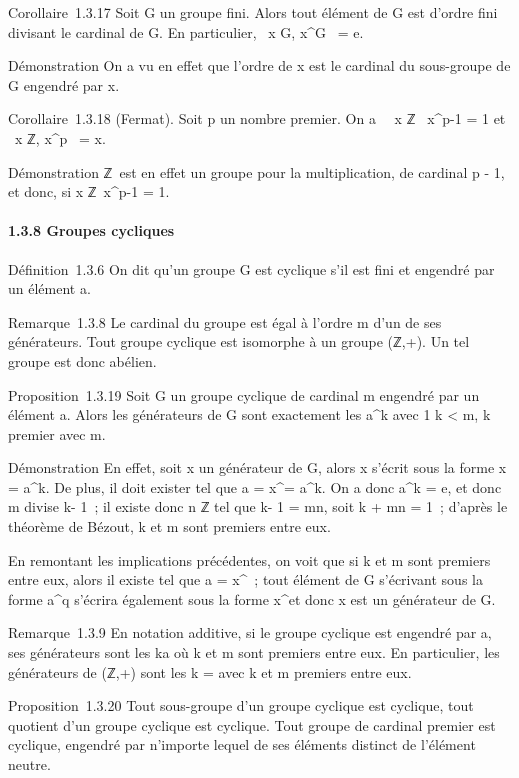 \documentclass[]{article}
\begin{document}
Corollaire~1.3.17 Soit G un groupe fini. Alors tout élément de G est
d'ordre fini divisant le cardinal de G. En particulier,
\forall~x \in G, x^\textbar{}G\textbar{}~ =
e.

Démonstration On a vu en effet que l'ordre de x est le cardinal du
sous-groupe de G engendré par x.

Corollaire~1.3.18 (Fermat). Soit p un nombre premier. On a
\forall~~x \in ℤ
\diagdown\0\, x^p-1 = 1 et
\forall~x \in ℤ, x^p~ = x.

Démonstration ℤ \diagdown\0\ est en effet
un groupe pour la multiplication, de cardinal p - 1, et donc, si x \in
ℤ \diagdown\0\, x^p-1 = 1.

\paragraph{1.3.8 Groupes cycliques}

Définition~1.3.6 On dit qu'un groupe G est cyclique s'il est fini et
engendré par un élément a.

Remarque~1.3.8 Le cardinal du groupe est égal à l'ordre m d'un de ses
générateurs. Tout groupe cyclique est isomorphe à un groupe (ℤ,+). Un
tel groupe est donc abélien.

Proposition~1.3.19 Soit G un groupe cyclique de cardinal m engendré par
un élément a. Alors les générateurs de G sont exactement les
a^k avec 1 \leq k \textless{} m, k premier avec m.

Démonstration En effet, soit x un générateur de G, alors x s'écrit sous
la forme x = a^k. De plus, il doit exister \ell tel que a =
x^\ell = a^k\ell. On a donc a^k = e, et
donc m divise k\ell - 1~; il existe donc n \in ℤ tel que k\ell - 1 = mn, soit k\ell
+ mn = 1~; d'après le théorème de Bézout, k et m sont premiers entre
eux.

En remontant les implications précédentes, on voit que si k et m sont
premiers entre eux, alors il existe \ell tel que a = x^\ell~; tout
élément de G s'écrivant sous la forme a^q s'écrira également
sous la forme x^\ellq et donc x est un générateur de G.

Remarque~1.3.9 En notation additive, si le groupe cyclique est engendré
par a, ses générateurs sont les ka où k et m sont premiers entre eux. En
particulier, les générateurs de (ℤ,+) sont les
k = \overlinek avec k et
m premiers entre eux.

Proposition~1.3.20 Tout sous-groupe d'un groupe cyclique est cyclique,
tout quotient d'un groupe cyclique est cyclique. Tout groupe de cardinal
premier est cyclique, engendré par n'importe lequel de ses éléments
distinct de l'élément neutre.
\end{document}
